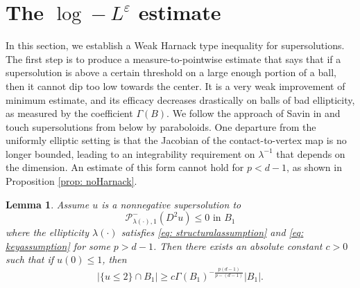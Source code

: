\documentclass[reqno]{amsart}
\numberwithin{equation}{section}
\newtheorem{lem}[thm]{Lemma}
\numberwithin{equation}{section}
\newcommand{\eps}{\varepsilon}
\begin{document}
\section{The $\log-L^\eps$ estimate}
\label{sec: logLeps}
In this section, we establish a Weak Harnack type inequality for supersolutions. The first step is to produce a measure-to-pointwise estimate that says that if a supersolution is above a certain threshold on a large enough portion of a ball, then it cannot dip too low towards the center. It is a very weak improvement of minimum estimate, and its efficacy decreases drastically on balls of bad ellipticity, as measured by the coefficient $\Gamma(B)$. We follow the approach of Savin in \cite{Savin2005} and touch supersolutions from below by paraboloids. One departure from the uniformly elliptic setting is that the Jacobian of the contact-to-vertex map is no longer bounded, leading to an integrability requirement on $\lambda^{-1}$ that depends on the dimension. An estimate of this form cannot hold for $p<d-1$, as shown in Proposition \ref{prop: noHarnack}.
    \begin{lem}
        \label{lem: weakharnack1} Assume $u$ is a nonnegative supersolution to
        $$\mathcal{P}^-_{\lambda(\cdot),1}(D^2u) \le 0\text{ in } B_1$$
        where the ellipticity $\lambda(\cdot)$ satisfies \eqref{eq: structuralassumption} and \eqref{eq: keyassumption} for some $p>d-1$. Then there exists an absolute constant $c>0$ such that if $u(0)\le 1$, then 
        $$|\{u \le 2\} \cap B_1| \ge c \Gamma(B_1)^{-\frac{p(d-1)}{p-(d-1)}} |B_1|.$$
    \end{lem}
\end{document}
